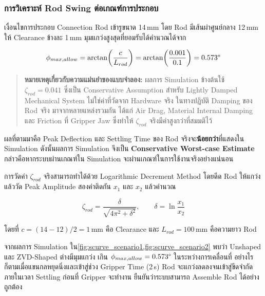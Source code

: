\subsubsection{การวิเคราะห์ Rod Swing ต่อเกณฑ์การประกอบ}
\label{subsubsec:rod_swing_criterion}

เงื่อนไขการประกอบ Connection Rod เข้ารูขนาด 14\,mm
โดย Rod มีเส้นผ่าศูนย์กลาง 12\,mm
ให้ Clearance ข้างละ 1\,mm
มุมแกว่งสูงสุดที่ยอมรับได้คำนวณได้จาก

\begin{equation}
    \phi_{max,allow} = \arctan\!\left(\frac{c}{L_{rod}}\right)
                     = \arctan\!\left(\frac{0.001}{0.1}\right)
                     = 0.573\degree
    \label{eq:phi_allow}
\end{equation}

\begin{quote}
\small
\textbf{หมายเหตุเกี่ยวกับความแม่นยำของแบบจำลอง:}
ผลการ Simulation ข้างต้นใช้ $\zeta_{rod} = 0.041$
ซึ่งเป็น Conservative Assumption
สำหรับ Lightly Damped Mechanical System
ไม่ใช่ค่าที่วัดจาก Hardware จริง
ในทางปฏิบัติ Damping ของ Rod จริง
มาจากหลายแหล่งรวมกัน ได้แก่
Air Drag, Material Internal Damping
และ Friction ที่ Gripper Jaw
ซึ่งทำให้ $\zeta_{rod}$ จริงมีค่าสูงกว่าที่สมมติไว้
\end{quote}


ผลที่ตามมาคือ Peak Deflection และ Settling Time
ของ Rod จริงจะ\textbf{น้อยกว่า}ที่แสดงใน Simulation
ดังนั้นผลการ Simulation จึงเป็น
\textbf{Conservative Worst-case Estimate}
กล่าวคือหากระบบผ่านเกณฑ์ใน Simulation
จะผ่านเกณฑ์ในการใช้งานจริงอย่างแน่นอน

การวัดค่า $\zeta_{rod}$ จริงสามารถทำได้ด้วย
Logarithmic Decrement Method
โดยดีด Rod ให้แกว่งแล้ววัด Peak Amplitude
สองค่าติดกัน $x_1$ และ $x_2$ แล้วคำนวณ

\begin{equation}
    \zeta_{rod} = \frac{\delta}{\sqrt{4\pi^2 + \delta^2}},
    \qquad \delta = \ln\frac{x_1}{x_2}
    \label{eq:log_decrement}
\end{equation}


\noindent โดยที่ $c = (14 - 12)/2 = 1$\,mm คือ Clearance
และ $L_{rod} = 100$\,mm คือความยาว Rod

จากผลการ Simulation ใน\cref{fig:scurve_scenario1,fig:scurve_scenario2}
พบว่า Unshaped และ ZVD-Shaped ต่างมีมุมแกว่ง
เกิน $\phi_{max,allow} = 0.573\degree$ ในระหว่างการเคลื่อนที่
อย่างไรก็ตามเมื่อแขนกลหยุดนิ่งและเข้าสู่ช่วง Gripper Time (2\,s)
Rod จะแกว่งลดลงจนเข้าสู่ขีดจำกัดภายในเวลา Settling
ก่อนที่ Gripper จะทำงาน
ยืนยันว่าระบบสามารถ Assemble Rod ได้อย่างถูกต้อง

